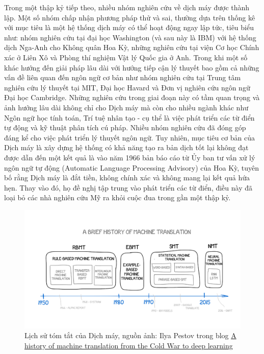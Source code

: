 Trong một thập kỷ tiếp theo, nhiều nhóm nghiên cứu về dịch máy được thành lập. Một số nhóm chấp nhận phương pháp thử và sai, thường dựa trên thống kê với mục tiêu là một hệ thống dịch máy có thể hoạt động ngay lập tức, tiêu biểu như: nhóm nghiên cứu tại đại học Washington (và sau này là IBM) với hệ thống dịch Nga-Anh cho Không quân Hoa Kỳ, những nghiên cứu tại viện Cơ học Chính xác ở Liên Xô và Phòng thí nghiệm Vật lý Quốc gia ở Anh. Trong khi một số khác hướng đến giải pháp lâu dài với hướng tiếp cận lý thuyết bao gồm cả những vấn đề liên quan đến ngôn ngữ cơ bản như nhóm nghiên cứu tại Trung tâm nghiên cứu lý thuyết tại MIT, Đại học Havard và Đơn vị nghiên cứu ngôn ngữ Đại học Cambridge. Những nghiên cứu trong giai đoạn này có tầm quan trọng và ảnh hưởng lâu dài không chỉ cho Dịch máy mà còn cho nhiều ngành khác như Ngôn ngữ học tính toán, Trí tuệ nhân tạo - cụ thể là việc phát triển các từ điển tự động và kỹ thuật phân tích cú pháp. Nhiều nhóm nghiên cứu đã đóng góp đáng kể cho việc phát triển lý thuyết ngôn ngữ. Tuy nhiên, mục tiêu cơ bản của Dịch máy là xây dựng hệ thống có khả năng tạo ra bản dịch tốt lại không đạt được dẫn đến một kết quả là vào năm 1966 bản báo cáo từ Ủy ban tư vấn xử lý ngôn ngữ tự động (Automatic Language Processing Advisory) của Hoa Kỳ, tuyên bố rằng Dịch máy là đắt tiền, không chính xác và không mang lại kết quả hứa hẹn. Thay vào đó, họ đề nghị tập trung vào phát triển các từ điển, điều này đã loại bỏ các nhà nghiên cứu Mỹ ra khỏi cuộc đua trong gần một thập kỷ. 


\begin{figure}
	\centering
	\includegraphics[width=\textwidth]{mthistory}
	\caption[Lịch sử tóm tắt của Dịch máy]{Lịch sử tóm tắt của Dịch máy, nguồn ảnh: Ilya Pestov trong blog \href{https://medium.freecodecamp.org/a-history-of-machine-translation-from-the-cold-war-to-deep-learning-f1d335ce8b5}{A history of machine translation from the Cold War to deep learning}}
	\label{fig_mthistory}
\end{figure}

